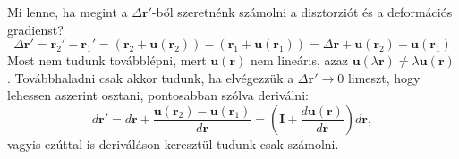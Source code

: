 \documentclass[12pt,a4paper]{scrartcl}
\let\mathbf\bm
\begin{document}
Mi lenne, ha megint a $\Delta {\mathbf{r}}'$-ből szeretnénk számolni a disztorziót és a deformációs gradienst?
\[\Delta {\mathbf{r}}' = {{\mathbf{r}}_2}' - {{\mathbf{r}}_1}' = \left( {{{\mathbf{r}}_2} + {\mathbf{u}}\left( {{{\mathbf{r}}_2}} \right)} \right) - \left( {{{\mathbf{r}}_1} + {\mathbf{u}}\left( {{{\mathbf{r}}_1}} \right)} \right) = \Delta {\mathbf{r}} + {\mathbf{u}}\left( {{{\mathbf{r}}_2}} \right) - {\mathbf{u}}\left( {{{\mathbf{r}}_1}} \right)\]
Most nem tudunk továbblépni, mert ${\mathbf{u}}\left( {\mathbf{r}} \right)$ nem lineáris, azaz ${\mathbf{u}}\left( {\lambda {\mathbf{r}}} \right) \ne \lambda {\mathbf{u}}\left( {\mathbf{r}} \right)$. Továbbhaladni csak akkor tudunk, ha elvégezzük a $\Delta {\mathbf{r}}' \to 0$ limeszt, hogy lehessen aszerint osztani, pontosabban szólva deriválni:
\[d{\mathbf{r}}' = d{\mathbf{r}} + \frac{{{\mathbf{u}}\left( {{{\mathbf{r}}_2}} \right) - {\mathbf{u}}\left( {{{\mathbf{r}}_1}} \right)}}{{d{\mathbf{r}}}} = \left( {{\mathbf{I}} + \frac{{d{\mathbf{u}}\left( {\mathbf{r}} \right)}}{{d{\mathbf{r}}}}} \right)d{\mathbf{r}},\]
vagyis ezúttal is deriváláson keresztül tudunk csak számolni.
\end{document}
